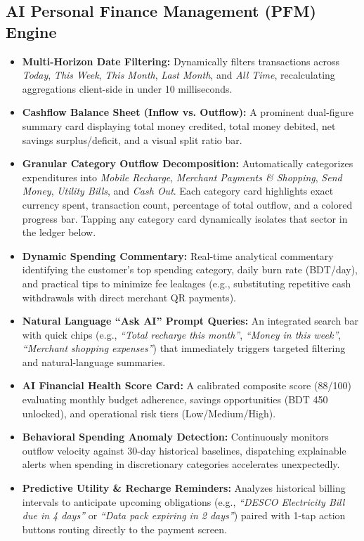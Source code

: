 \documentclass[10.5pt,a4paper]{article}
\begin{document}
\subsection{AI Personal Finance Management (PFM) Engine}
\begin{itemize}[leftmargin=*]
    \item \textbf{Multi-Horizon Date Filtering:} Dynamically filters transactions across \textit{Today}, \textit{This Week}, \textit{This Month}, \textit{Last Month}, and \textit{All Time}, recalculating aggregations client-side in under 10 milliseconds.
    \item \textbf{Cashflow Balance Sheet (Inflow vs. Outflow):} A prominent dual-figure summary card displaying total money credited, total money debited, net savings surplus/deficit, and a visual split ratio bar.
    \item \textbf{Granular Category Outflow Decomposition:} Automatically categorizes expenditures into \textit{Mobile Recharge}, \textit{Merchant Payments \& Shopping}, \textit{Send Money}, \textit{Utility Bills}, and \textit{Cash Out}. Each category card highlights exact currency spent, transaction count, percentage of total outflow, and a colored progress bar. Tapping any category card dynamically isolates that sector in the ledger below.
    \item \textbf{Dynamic Spending Commentary:} Real-time analytical commentary identifying the customer's top spending category, daily burn rate (BDT/day), and practical tips to minimize fee leakages (e.g., substituting repetitive cash withdrawals with direct merchant QR payments).
    \item \textbf{Natural Language ``Ask AI'' Prompt Queries:} An integrated search bar with quick chips (e.g., \textit{``Total recharge this month''}, \textit{``Money in this week''}, \textit{``Merchant shopping expenses''}) that immediately triggers targeted filtering and natural-language summaries.
    \item \textbf{AI Financial Health Score Card:} A calibrated composite score (88/100) evaluating monthly budget adherence, savings opportunities (BDT 450 unlocked), and operational risk tiers (Low/Medium/High).
    \item \textbf{Behavioral Spending Anomaly Detection:} Continuously monitors outflow velocity against 30-day historical baselines, dispatching explainable alerts when spending in discretionary categories accelerates unexpectedly.
    \item \textbf{Predictive Utility \& Recharge Reminders:} Analyzes historical billing intervals to anticipate upcoming obligations (e.g., \textit{``DESCO Electricity Bill due in 4 days''} or \textit{``Data pack expiring in 2 days''}) paired with 1-tap action buttons routing directly to the payment screen.

\end{itemize}
\end{document}
